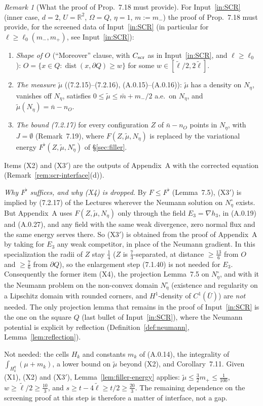 \documentclass[11pt]{article}
\theoremstyle{definition}
\theoremstyle{remark}
\newtheorem{remark}[theorem]{Remark}
\newcommand{\R}{\mathbb R}
\begin{document}
\begin{remark}[What the proof of Prop.~7.18 must provide]\label{rem:wp13-export}
For Input~\ref{in:SCR} (inner case, $d=2$, $U=\R^2$, $\Omega=Q$, $\eta=1$, $m:=m_-$) the proof of
Prop.~7.18 must provide, for the screened data of Input~\ref{in:SCR} (in particular for
$\ell\ge\ell_0(m_-,m_+)$, see Input~\ref{in:SCR}):
\begin{enumerate}[label=(X\arabic*)]
\item \emph{Shape of $O$} (``Moreover'' clause, with $C_{\rm scr}$ as in
  Input~\ref{in:SCR}, and $\ell\ge\ell_0$): $O=\{x\in Q:\operatorname{dist}(x,\partial Q)\ge w\}$ for some
  $w\in[\tilde\ell/2,2\tilde\ell]$.
\item \emph{The measure $\tilde\mu$} ((7.2.15)--(7.2.16), (A.0.15)--(A.0.16)): $\tilde\mu$ has a density on $N_\eta$, vanishes off $N_\eta$, satisfies
  $0\le\tilde\mu\le\bar m+m_-/2$ a.e.\ on $N_\eta$, and $\tilde\mu(N_\eta)=\bar n-n_O$.
\item[(X3$'$)] \emph{The bound (7.2.17)} for every configuration $Z$ of $\bar n-n_O$ points in $N_\eta$, with
  $J=\emptyset$ (Remark~7.19), where $F(Z,\tilde\mu,N_\eta)$ is replaced by the variational energy
  $F^\flat(Z,\tilde\mu,N_\eta^\circ)$ of \S\ref{sec:filler}.
\end{enumerate}
Items (X2) and (X3$'$) are the outputs of Appendix~A with the corrected equation
(Remark~\ref{rem:scr-interface}(d)).

\emph{Why $F^\flat$ suffices, and why (X4) is dropped.} By $F\le F^\flat$ (Lemma~7.5), (X3$'$) is implied by
(7.2.17) of the Lectures wherever the Neumann solution on $N_\eta^\circ$ exists. But Appendix~A uses
$F(Z,\tilde\mu,N_\eta)$ only through the field $E_3=\nabla h_3$, in (A.0.19) and (A.0.27),
and any field with the same weak divergence, zero normal flux and
the same energy serves there. So (X3$'$) is obtained from the proof of Appendix~A by taking for $E_3$ any
weak competitor, in place of the Neumann gradient. In this specialization the radii of $Z$ stay $\tfrac14$
($Z$ is $\tfrac73$-separated, at distance $\ge\tfrac{13}6$ from $O$ and $\ge\tfrac76$ from $\partial Q$), so
the enlargement step (7.1.40) is not needed for $E_3$. Consequently the former item (X4), the projection
Lemma~7.5 on $N_\eta^\circ$, and with it the Neumann problem on the non-convex domain $N_\eta^\circ$
(existence and regularity on a Lipschitz domain with rounded corners, and $H^1$-density of
$C^1(\bar U)$) are \emph{not} needed. The only projection lemma that remains in the proof of
Input~\ref{in:SCR} is the one on the square $Q$ (last bullet of Input~\ref{in:SCR}), where the Neumann
potential is explicit by reflection (Definition~\ref{def:neumann}, Lemma~\ref{lem:reflection}).

Not needed: the cells $H_k$ and constants $m_k$ of (A.0.14), the integrality of
$\int_{H_k^\eta}(\mu+m_k)$, a lower bound on $\tilde\mu$ beyond (X2), and Corollary~7.11. Given
(X1), (X2) and (X3$'$), Lemma~\ref{lem:filler-energy} applies: $\tilde\mu\le\tfrac32m_+\le\tfrac1{100}$,
$w\ge\tilde\ell/2\ge\tfrac{10}3$, and $s\ge t-4\tilde\ell\ge t/2\ge\tfrac{20}3$. The remaining dependence
on the screening proof at this step is therefore a matter of interface, not a gap.
\end{remark}
\end{document}

